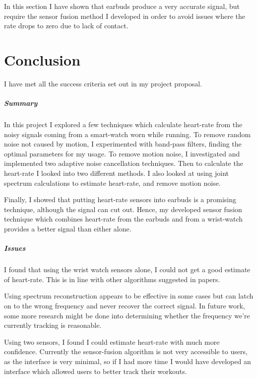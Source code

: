 \documentclass[12pt,a4paper,twoside,openright]{report}
\begin{document}
In this section I have shown that earbuds produce a very accurate signal, but
require the sensor fusion method I developed in order to avoid issues where
the rate drops to zero due to lack of contact.

\chapter{Conclusion}

I have met all the success criteria set out in my project proposal.

\paragraph{Summary}

In this project I explored a few techniques which calculate heart-rate from
the noisy signals coming from a smart-watch worn while running. To remove
random noise not caused by motion, I experimented with band-pass filters,
finding the optimal parameters for my usage. To remove motion noise, I
investigated and implemented two adaptive noise cancellation techniques. Then
to calculate the heart-rate I looked into two different methods. I also
looked at using joint spectrum calculations to estimate heart-rate, and remove
motion noise.

Finally, I showed that putting heart-rate sensors into earbuds is a promising
technique, although the signal can cut out. Hence, my developed sensor fusion
technique which combines heart-rate from the earbuds and from a wrist-watch
provides a better signal than either alone.

\paragraph{Issues}

I found that using the wrist watch sensors alone, I could not get a 
good estimate of heart-rate. This is in line with other algorithms suggested
in papers.

Using spectrum reconstruction appears to be effective in some cases but can
latch on to the wrong frequency and never recover the correct signal. In
future work, some more research might be done into determining whether the
frequency we're currently tracking is reasonable.

Using two sensors, I found I could estimate heart-rate with much more
confidence. Currently the sensor-fusion algorithm is not very accessible to
users, as the interface is very minimal, so if I had more time I would have
developed an interface which allowed users to better track their workouts.
\end{document}
